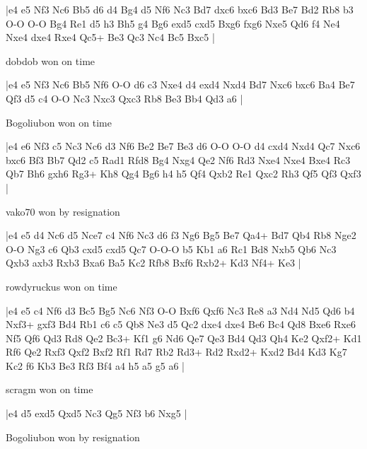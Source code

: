 \makegametitle
|e4 e5 Nf3 Nc6 Bb5 d6 d4 Bg4 d5 Nf6 Nc3 Bd7 dxc6 bxc6 Bd3 Be7 Bd2 Rb8 b3 O-O O-O Bg4 Re1 d5 h3 Bh5 g4 Bg6 exd5 cxd5 Bxg6 fxg6 Nxe5 Qd6 f4 Ne4 Nxe4 dxe4 Rxe4 Qc5+ Be3 Qc3 Nc4 Bc5 Bxc5  |

\showboard

dobdob won on time

\makegametitle
|e4 e5 Nf3 Nc6 Bb5 Nf6 O-O d6 c3 Nxe4 d4 exd4 Nxd4 Bd7 Nxc6 bxc6 Ba4 Be7 Qf3 d5 c4 O-O Nc3 Nxc3 Qxc3 Rb8 Be3 Bb4 Qd3 a6  |

\showboard

Bogoliubon won on time

\makegametitle
|e4 e6 Nf3 c5 Nc3 Nc6 d3 Nf6 Be2 Be7 Be3 d6 O-O O-O d4 cxd4 Nxd4 Qc7 Nxc6 bxc6 Bf3 Bb7 Qd2 c5 Rad1 Rfd8 Bg4 Nxg4 Qe2 Nf6 Rd3 Nxe4 Nxe4 Bxe4 Rc3 Qb7 Bh6 gxh6 Rg3+ Kh8 Qg4 Bg6 h4 h5 Qf4 Qxb2 Re1 Qxc2 Rh3 Qf5 Qf3 Qxf3  |

\showboard

vako70 won by resignation

\makegametitle
|e4 e5 d4 Nc6 d5 Nce7 c4 Nf6 Nc3 d6 f3 Ng6 Bg5 Be7 Qa4+ Bd7 Qb4 Rb8 Nge2 O-O Ng3 c6 Qb3 cxd5 cxd5 Qc7 O-O-O b5 Kb1 a6 Rc1 Bd8 Nxb5 Qb6 Nc3 Qxb3 axb3 Rxb3 Bxa6 Ba5 Kc2 Rfb8 Bxf6 Rxb2+ Kd3 Nf4+ Ke3  |

\showboard

rowdyruckus won on time

\makegametitle
|e4 e5 c4 Nf6 d3 Bc5 Bg5 Nc6 Nf3 O-O Bxf6 Qxf6 Nc3 Re8 a3 Nd4 Nd5 Qd6 b4 Nxf3+ gxf3 Bd4 Rb1 c6 c5 Qb8 Ne3 d5 Qc2 dxe4 dxe4 Be6 Bc4 Qd8 Bxe6 Rxe6 Nf5 Qf6 Qd3 Rd8 Qe2 Bc3+ Kf1 g6 Nd6 Qe7 Qe3 Bd4 Qd3 Qh4 Ke2 Qxf2+ Kd1 Rf6 Qe2 Rxf3 Qxf2 Bxf2 Rf1 Rd7 Rb2 Rd3+ Rd2 Rxd2+ Kxd2 Bd4 Kd3 Kg7 Kc2 f6 Kb3 Be3 Rf3 Bf4 a4 h5 a5 g5 a6  |

\showboard

scragm won on time

\makegametitle
|e4 d5 exd5 Qxd5 Nc3 Qg5 Nf3 b6 Nxg5  |

\showboard

Bogoliubon won by resignation

